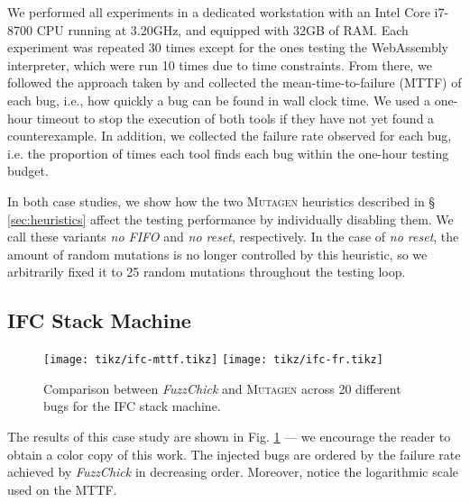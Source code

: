 \documentclass[sigconf, anonymous, review]{acmart}
\newcommand{\fuzzchick}{\textit{FuzzChick}\xspace}
\newcommand{\mutagen}{\textsc{Mutagen}\xspace}
\begin{document}
We performed all experiments in a dedicated workstation with an Intel Core
i7-8700 CPU running at 3.20GHz, and equipped with 32GB of RAM.
%
Each experiment was repeated 30 times except for the ones testing the
WebAssembly interpreter, which were run 10 times due to time constraints.
%
From there, we followed the approach taken by
\citeauthor{lampropoulos2019coverage} and collected the mean-time-to-failure
(MTTF) of each bug, i.e., how quickly a bug can be found in wall clock time.
%
We used a one-hour timeout to stop the execution of both tools if they have not
yet found a counterexample.
%
In addition, we collected the failure rate observed for each bug, i.e. the
proportion of times each tool finds each bug within the one-hour testing budget.
%

In both case studies, we show how the two \mutagen heuristics described in \S
\ref{sec:heuristics} affect the testing performance by individually disabling
them.
%
We call these variants \textit{no FIFO} and \textit{no reset}, respectively.
%
In the case of \textit{no reset}, the amount of random mutations is no longer
controlled by this heuristic, so we arbitrarily fixed it to 25 random mutations
throughout the testing loop.

\subsection{IFC Stack Machine}

\begin{figure}[t]
  \centering
  \texttt{[image: tikz/ifc-mttf.tikz]}
  \texttt{[image: tikz/ifc-fr.tikz]}
  \caption{\label{fig:results:ifc} Comparison between \fuzzchick and \mutagen
    across 20 different bugs for the IFC stack machine. }
\end{figure}


The results of this case study are shown in Fig. \ref{fig:results:ifc} --- we
encourage the reader to obtain a color copy of this work.
%
The injected bugs are ordered by the failure rate achieved by \fuzzchick in
decreasing order.
%
Moreover, notice the logarithmic scale used on the MTTF.
\end{document}
